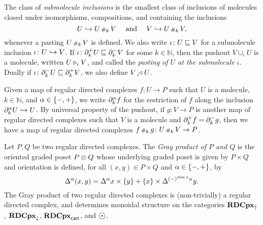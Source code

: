 The class of \emph{submolecule inclusions} is the smallest class of inclusions of molecules closed under isomorphisms, compositions, and containing the inclusions
\begin{equation*}
    U \hookrightarrow U \,{\scriptstyle\#}_{k}\, V \quad\text{ and }\quad V \hookrightarrow U \,{\scriptstyle\#}_{k}\, V,
\end{equation*}
whenever a pasting \( U \,{\scriptstyle\#}_{k}\, V \) is defined. 
We also write \( \iota \colon U \sqsubseteq V \) for a submolecule inclusion \( \iota \colon U \hookrightarrow V \).
If \( \iota \colon \partial_{k}^{+} U \sqsubseteq \partial_{k}^{-} V \) for some \( k \in \mathbb{N} \), then the pushout \( V \cup_\iota U \) is a molecule, written \( U \triangleright_{\iota} V \), and called the \emph{pasting of \( U \) at the submolecule \( \iota \)}.
Dually if \( \iota \colon \partial_{k}^{-} U \sqsubseteq \partial_{k}^{+} V \), we also define \( V \prescript{}{\iota\!}{\triangleleft}\; U \).

Given a map of regular directed complexes \( f \colon U \to P \) such that \( U \) is a molecule, \( k \in \mathbb{N} \), and \( \alpha \in \left\{ {-, +} \right\} \), we write \( \partial_{k}^{\alpha} f \) for the restriction of \( f \) along the inclusion \( \partial_{k}^{\alpha} U \hookrightarrow U \).
By universal property of the pushout, if  \( g \colon V \to P \) is another map of regular directed complexes such that \( V \) is a molecule and \( \partial_{k}^{+} f = \partial_{k}^{-}g \), then we have a map of regular directed complexes \( f \,{\scriptstyle\#}_{k}\, g \colon U \,{\scriptstyle\#}_{k}\, V \to P \).


Let \( P, Q \) be two regular directed complexes.
The \emph{Gray product of \( P \) and \( Q \)} is the oriented graded poset \( P \otimes Q \) whose underlying graded poset is given by \( P \times Q \) and orientation is defined, for all \( (x, y) \in P \times Q \) and \( \alpha \in \left\{ {-, +} \right\} \), by
\begin{equation*}
    \Delta_{}^{\alpha} (x, y) = \Delta_{}^{\alpha} x \times \left\{ {y} \right\} + \left\{ {x} \right\} \times \Delta_{}^{(-)^{\dim x} \alpha} y.
\end{equation*}  
The Gray product of two regular directed complexes is (non-trivially) a regular directed complex, and determines monoidal structure on the categories \( \mathbf{RDCpx}_{\uparrow} \), \( \mathbf{RDCpx}_{\downarrow} \), \( \mathbf{RDCpx}_{\mathsf{cart}} \), and \( \atom \).

